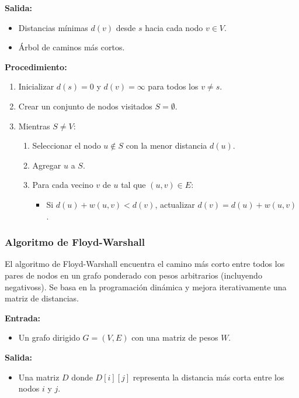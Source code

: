 \documentclass[11pt]{article}
\begin{document}
			\textbf{Salida:}
			\begin{itemize}
				\item Distancias mínimas $d(v)$ desde $s$ hacia cada nodo $v \in V$.
				\item Árbol de caminos más cortos.
			\end{itemize}

			\textbf{Procedimiento:}
			\begin{enumerate}
				\item Inicializar $d(s) = 0$ y $d(v) = \infty$ para todos los $v \neq s$.
				\item Crear un conjunto de nodos visitados $S = \emptyset$.
				\item Mientras $S \neq V$:
				\begin{enumerate}
					\item Seleccionar el nodo $u \notin S$ con la menor distancia $d(u)$.
					\item Agregar $u$ a $S$.
					\item Para cada vecino $v$ de $u$ tal que $(u,v) \in E$:
					\begin{itemize}
						\item Si $d(u) + w(u,v) < d(v)$, actualizar $d(v) = d(u) + w(u,v)$.
					\end{itemize}
				\end{enumerate}
			\end{enumerate}

			\subsubsection{Algoritmo de Floyd-Warshall}

			El algoritmo de Floyd-Warshall encuentra el camino más corto entre todos los pares de nodos en un grafo ponderado con pesos arbitrarios (incluyendo negativoss). Se basa en la programación dinámica y mejora iterativamente una matriz de distancias.

			\textbf{Entrada:}
			\begin{itemize}
				\item Un grafo dirigido $G = (V, E)$ con una matriz de pesos $W$.
			\end{itemize}

			\textbf{Salida:}
			\begin{itemize}
				\item Una matriz $D$ donde $D[i][j]$ representa la distancia más corta entre los nodos $i$ y $j$.
			\end{itemize}
\end{document}
